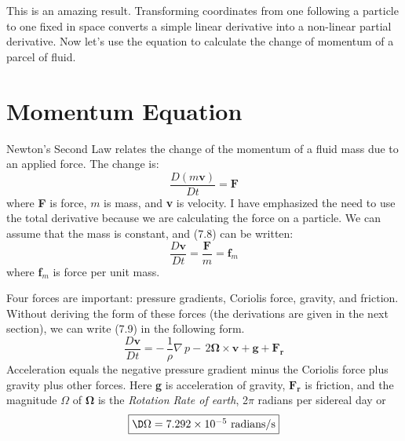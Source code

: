 This is an amazing result. Transforming coordinates from one following
a particle to one fixed in space converts a simple linear derivative
into a non-linear partial derivative. Now let's use the equation to
calculate the change of momentum of a parcel of fluid.

\section{Momentum Equation}
Newton's Second Law relates the change of the
momentum of a fluid mass due to an applied force. The change is:
\begin{equation}
\frac{D(m\textbf{v})}{Dt} = \textbf{F}
\end{equation}
where \textbf{F} is force, $m$ is mass, and \textbf{v} is velocity. I
have emphasized the need to use the total derivative because we are
calculating the force on a particle. We can assume that the mass is
constant, and (7.8) can be written:
\begin{equation}
\frac{D\textbf{v}}{Dt} = \frac{\textbf{F}}{m} = \textbf{f$_m$}
\end{equation}
where \textbf{f$_m$} is force per unit mass.

Four forces are important: pressure gradients, Coriolis force,
gravity, and friction. Without deriving the form of these forces (the
derivations are given in the next section), we can write (7.9) in the
following form.
\begin{equation}
\frac{D\mathbf{v}}{Dt} = -\,\frac{1}{\rho}\nabla\,p -
\,2\boldsymbol{\Omega}
\times \mathbf{v} + \mathbf{g} + \mathbf{F_r}
\end{equation}
Acceleration equals the negative pressure gradient minus the Coriolis
force plus gravity plus other forces. Here \textbf{g} is acceleration
of gravity, $\mathbf{F_r}$ is friction, and the magnitude $\Omega$ of
$\boldsymbol{\Omega}$ is the \textit{Rotation Rate of
  earth}, 2$\pi$ radians per
sidereal day or
\begin{equation}
\fbox{$\D
\Omega = 7.292 \times 10^{-5} \text{ radians/s} $}
\end{equation}

